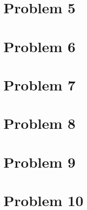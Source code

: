 \documentclass{article}
\begin{document}
\section*{Problem 5}
\section*{Problem 6}
\section*{Problem 7}
\section*{Problem 8}
\section*{Problem 9}
\section*{Problem 10}
\end{document}
